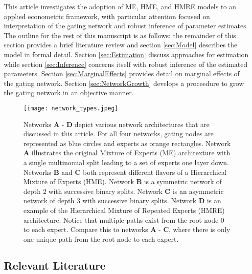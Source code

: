 \documentclass[12pt]{article}
\begin{document}
\bigskip

This article investigates the adoption of ME, HME, and HMRE models to an applied
econometric framework, with particular attention focused on interpretation of
the gating network and robust inference of parameter estimates. The outline for the
rest of this manuscript is as follows: the remainder of this section
provides a brief literature review and section \ref{sec:Model} describes
the model in formal detail. Section \ref{sec:Estimation} discuss approaches
for estimation while section \ref{sec:Inference} concerns itself with robust
inference of the estimated parameters. Section \ref{sec:MarginalEffects}
provides detail on marginal effects of the gating network. Section
\ref{sec:NetworkGrowth} develops a proceedure to grow the gating network
in an objective manner. 

\begin{figure}[!ht]
  \centering
  \texttt{[image: network\_types.jpeg]}
  \caption{Networks \textbf{A} - \textbf{D} depict various network
  architectures that are discussed in this article. For all four networks,
  gating nodes are represented as blue circles and experts as orange
  rectangles. Network \textbf{A} illustrates the original Mixture of
  Experts (ME) architexture with a single multinomial split leading
  to a set of experts one layer down. Networks \textbf{B} and \textbf{C} both
  represent different flavors of a Hierarchical Mixture of Experts (HME). Network
  \textbf{B} is a symmetric network of depth 2 with successive binary splits.
  Network \textbf{C} is an asymmetric network of depth 3 with successive
  binary splits. Network \textbf{D} is an example of the Hierarchical
  Mixture of Repeated Experts (HMRE) architecture. Notice that multiple paths
  exist from the root node $0$ to each expert. Compare this to networks
  \textbf{A} - \textbf{C}, where there is only one unique path from the root
  node to each expert.}
  \label{fig:network_comparison}
\end{figure}


\subsection{Relevant Literature}
\end{document}
